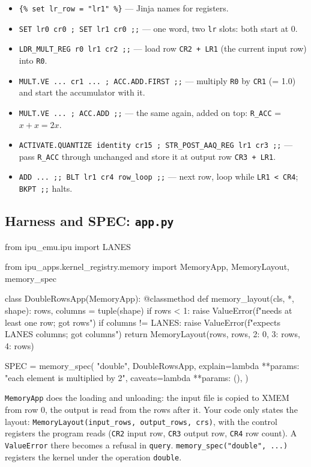\documentclass[11pt,a4paper]{article}
\begin{document}
\begin{itemize}
\item \texttt{\{\% set lr\_row = "lr1" \%\}} --- Jinja names for registers.
\item \texttt{SET lr0 cr0 ; SET lr1 cr0 ;;} --- one word, two \texttt{lr}
  slots: both start at 0.
\item \texttt{LDR\_MULT\_REG r0 lr1 cr2 ;;} --- load row \texttt{CR2 + LR1}
  (the current input row) into \texttt{R0}.
\item \texttt{MULT.VE ... cr1 ... ; ACC.ADD.FIRST ;;} --- multiply \texttt{R0}
  by \texttt{CR1} (= 1.0) and start the accumulator with it.
\item \texttt{MULT.VE ... ; ACC.ADD ;;} --- the same again, added on top:
  \texttt{R\_ACC} = $x + x = 2x$.
\item \texttt{ACTIVATE.QUANTIZE identity cr15 ; STR\_POST\_AAQ\_REG lr1 cr3 ;;}
  --- pass \texttt{R\_ACC} through unchanged and store it at output row
  \texttt{CR3 + LR1}.
\item \texttt{ADD ... ;; BLT lr1 cr4 row\_loop ;;} --- next row, loop while
  \texttt{LR1 < CR4}; \texttt{BKPT ;;} halts.
\end{itemize}

\subsection{Harness and SPEC: \texttt{app.py}}

\begin{pycode}
from ipu_emu.ipu import LANES

from ipu_apps.kernel_registry.memory import MemoryApp, MemoryLayout, memory_spec

class DoubleRowsApp(MemoryApp):
    @classmethod
    def memory_layout(cls, *, shape):
        rows, columns = tuple(shape)
        if rows < 1:
            raise ValueError(f"needs at least one row; got {rows}")
        if columns != LANES:
            raise ValueError(f"expects {LANES} columns; got {columns}")
        return MemoryLayout(rows, rows, {2: 0, 3: rows, 4: rows})

SPEC = memory_spec(
    "double", DoubleRowsApp,
    explain=lambda **params: "each element is multiplied by 2",
    caveats=lambda **params: (),
)
\end{pycode}

\texttt{MemoryApp} does the loading and unloading: the input file is copied to
XMEM from row 0, the output is read from the rows after it. Your code only
states the layout: \texttt{MemoryLayout(input\_rows, output\_rows, crs)}, with
the control registers the program reads (\texttt{CR2} input row,
\texttt{CR3} output row, \texttt{CR4} row count). A \texttt{ValueError} there
becomes a refusal in \texttt{query}. \texttt{memory\_spec("double", ...)}
registers the kernel under the operation \texttt{double}.
\end{document}
